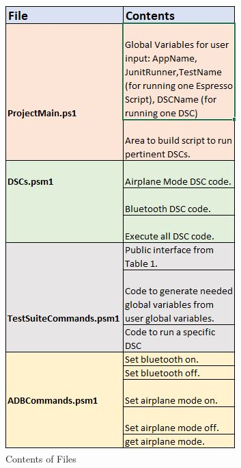\begin{figure}[t]
	\centering
	\caption[Contents of Files]{Contents of Files}
	\label{fig:table3}
	\includegraphics[width=1\linewidth]{table3}
\end{figure}

   

